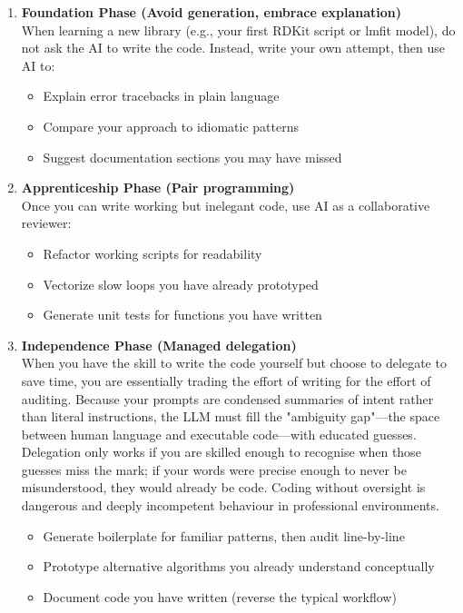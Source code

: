 \begin{enumerate}
    \item \textbf{Foundation Phase (Avoid generation, embrace explanation)} \\
    When learning a new library (e.g., your first RDKit script or lmfit model), do not ask the AI to write the code. Instead, write your own attempt, then use AI to:
    \begin{itemize}
        \item Explain error tracebacks in plain language
        \item Compare your approach to idiomatic patterns
        \item Suggest documentation sections you may have missed
    \end{itemize}
    
    \item \textbf{Apprenticeship Phase (Pair programming)} \\
    Once you can write working but inelegant code, use AI as a collaborative reviewer:
    \begin{itemize}
        \item Refactor working scripts for readability
        \item Vectorize slow loops you have already prototyped
        \item Generate unit tests for functions you have written
    \end{itemize}
    
    \item \textbf{Independence Phase (Managed delegation)} \\
    When you have the skill to write the code yourself but choose to delegate to save time, you are essentially trading the effort of writing for the effort of auditing. Because your prompts are condensed summaries of intent rather than literal instructions, the LLM must fill the "ambiguity gap"---the space between human language and executable code---with educated guesses. Delegation only works if you are skilled enough to recognise when those guesses miss the mark; if your words were precise enough to never be misunderstood, they would already be code. Coding without oversight is dangerous and deeply incompetent behaviour in professional environments.
    \begin{itemize}
        \item Generate boilerplate for familiar patterns, then audit line-by-line
        \item Prototype alternative algorithms you already understand conceptually
        \item Document code you have written (reverse the typical workflow)
    \end{itemize}
\end{enumerate}


